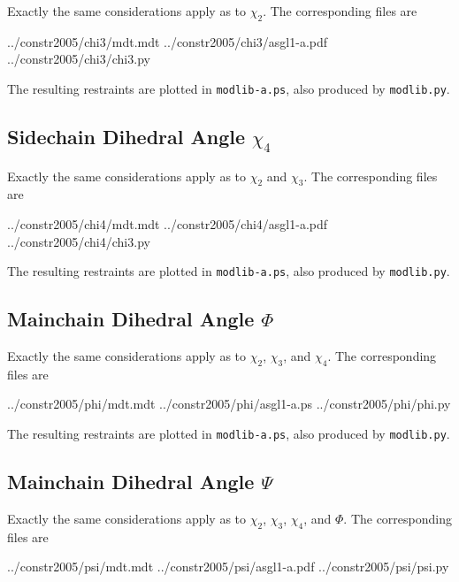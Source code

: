 Exactly the same considerations apply as to $\chi_2$. The corresponding files are

           {../constr2005/chi3/mdt.mdt}
           {../constr2005/chi3/asgl1-a.pdf}
           {../constr2005/chi3/chi3.py}

The resulting restraints are plotted in
{\tt modlib-a.ps}, also produced by {\tt modlib.py}.


\subsection{Sidechain Dihedral Angle $\chi_4$}

Exactly the same considerations apply as to $\chi_2$ and $\chi_3$. The corresponding files are

           {../constr2005/chi4/mdt.mdt}
           {../constr2005/chi4/asgl1-a.pdf}
           {../constr2005/chi4/chi3.py}

The resulting restraints are plotted in
{\tt modlib-a.ps}, also produced by {\tt modlib.py}.


\subsection{Mainchain Dihedral Angle $\Phi$}

Exactly the same considerations apply as to $\chi_2$, $\chi_3$, and $\chi_4$. The corresponding files are

           {../constr2005/phi/mdt.mdt}
           {../constr2005/phi/asgl1-a.ps}
           {../constr2005/phi/phi.py}

The resulting restraints are plotted in
{\tt modlib-a.ps}, also produced by {\tt modlib.py}.


\subsection{Mainchain Dihedral Angle $\Psi$}

Exactly the same considerations apply as to $\chi_2$, $\chi_3$, $\chi_4$, and $\Phi$. The corresponding files are

           {../constr2005/psi/mdt.mdt}
           {../constr2005/psi/asgl1-a.pdf}
           {../constr2005/psi/psi.py}

